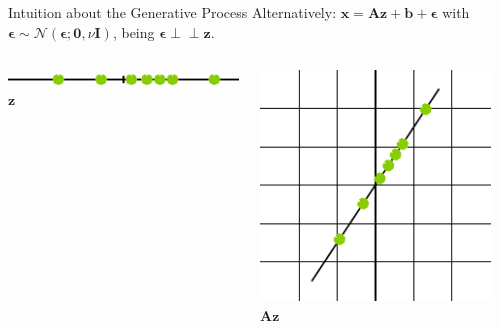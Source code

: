 \documentclass{beamer}
\newcommand{\indep}{\perp\!\!\!\perp}
\newcommand{\bs}[1]{\boldsymbol{#1}}
\begin{document}
\begin{frame}{Intuition about the Generative Process}
Alternatively: $\bs{x}=\bs{A}\bs{z}+\bs{b}+\bs{\epsilon}$ with $\bs{\epsilon}\sim\mathcal{N}(\bs{\epsilon};\bs{0},\nu\bs{I})$, being $\bs{\epsilon} \indep \bs{z}$.\vspace{\baselineskip}

\begin{columns}[b]
 \begin{column}{0.22\textwidth}
 \centering
  \includegraphics[width=\textwidth]{fig/ppca_generation_1.pdf}\\ $\bs{z}$
 \end{column}\hfill
 \begin{column}{0.22\textwidth}
 \centering
  \includegraphics[width=\textwidth]{fig/ppca_generation_2.pdf}\\ $\bs{A}\bs{z}$
 \end{column}\hfill
  \begin{column}{0.22\textwidth}
  \centering

\end{column}
\end{columns}
\end{frame}
\end{document}
